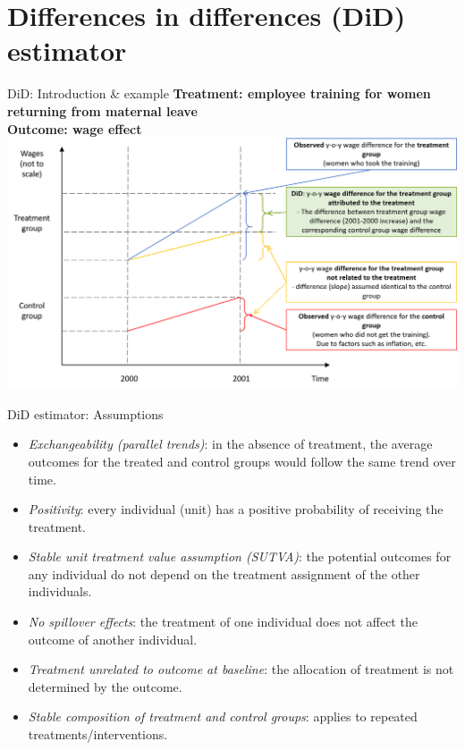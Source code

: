 \documentclass{beamer}
\begin{document}
\section{Differences in differences (DiD) estimator}
\begin{frame}{DiD: Introduction \& example}
\vfill
{\footnotesize \textbf{Treatment: employee training for women returning from maternal leave\\ Outcome: wage effect}} \\
\medskip
\includegraphics[width=\textwidth]{./IMG/Obrazek3}
\end{frame}
\begin{frame}{DiD estimator: Assumptions}
\begin{itemize}
    \item \emph{Exchangeability (parallel trends)}: in the absence of treatment, the average outcomes for the treated and control groups would follow the same trend over time.
    \item \emph{Positivity}: every individual (unit) has a positive probability of receiving the treatment.
    \item \emph{Stable unit treatment value assumption (SUTVA)}: the potential outcomes for any individual do not depend on the treatment assignment of the other individuals.
    \item \emph{No spillover effects}: the treatment of one individual does not affect the outcome of another individual.
    \item \emph{Treatment unrelated to outcome at baseline}: the allocation of treatment is not determined by the outcome. 
    \item \emph{Stable composition of treatment and control groups}: applies to repeated treatments/interventions.
\end{itemize}
\end{frame}
\end{document}
